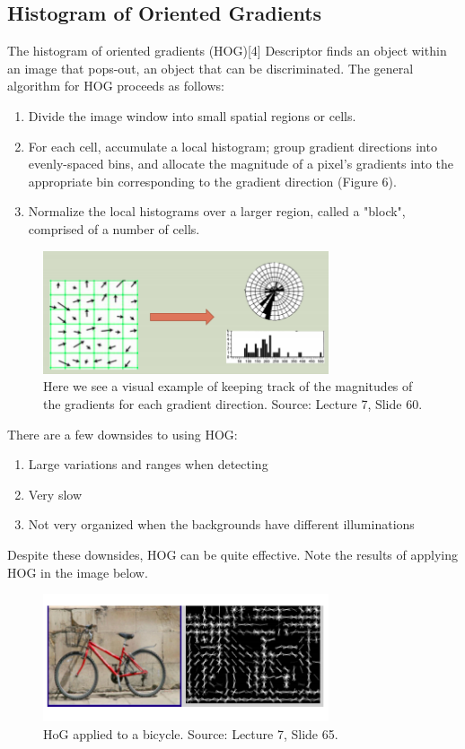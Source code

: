 \documentclass{article}
\begin{document}
\subsection{Histogram of Oriented Gradients}
The histogram of oriented gradients (HOG)[4] Descriptor finds an object within an image that pops-out, an object that can be discriminated. The general algorithm for HOG proceeds as follows:
\begin{enumerate}
	\item Divide the image window into small spatial regions or cells.
    \item For each cell, accumulate a local histogram; group gradient directions into evenly-spaced bins, and allocate the magnitude of a pixel's gradients into the appropriate bin corresponding to the gradient direction (Figure 6).
    \item Normalize the local histograms over a larger region, called a "block", comprised of a number of cells.
\end{enumerate}

\begin{figure}[h]
  \centering
  \includegraphics[width=0.75\textwidth]{histogram}
  \caption{Here we see a visual example of keeping track of the magnitudes of the gradients for each gradient direction. Source: Lecture 7, Slide 60.}
\end{figure}

There are a few downsides to using HOG:
\begin{enumerate}
	\item Large variations and ranges when detecting
    \item Very slow
    \item Not very organized when the backgrounds have different illuminations
\end{enumerate}

Despite these downsides, HOG can be quite effective. Note the results of applying HOG in the image below.

\begin{figure}[h]
  \centering
  \includegraphics[width=0.75\textwidth]{bike}
  \caption{HoG applied to a bicycle. Source: Lecture 7, Slide 65.}
\end{figure}
\end{document}
